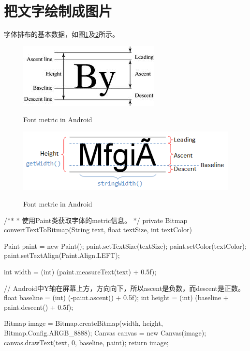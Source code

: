 ﻿\section[Draw text as picture]{把文字绘制成图片}
字体排布的基本数据，如图\ref{fig:android_font_metric}及\ref{fig:android_font_metric_2}所示。

\begin{figure}
  \centering
  \includegraphics[width=.3\textwidth]{picturedir/font_metric.png}\\
  \caption{Font metric in Android}\label{fig:android_font_metric}
\end{figure}

\begin{figure}
  \centering
  \includegraphics[width=.6\textwidth]{picturedir/font_metric_2.png}\\
  \caption{Font metric in Android}\label{fig:android_font_metric_2}
\end{figure}

\begin{javacode}
/**
 *  使用Paint类获取字体的metric信息。
 */
private Bitmap convertTextToBitmap(String text, float textSize, int textColor) {
  Paint paint = new Paint();
  paint.setTextSize(textSize);
  paint.setColor(textColor);
  paint.setTextAlign(Paint.Align.LEFT);
  
  int width = (int) (paint.measureText(text) + 0.5f);
  
  // Android中Y轴在屏幕上方，方向向下，所以ascent是负数，而descent是正数。
  float baseline = (int) (-paint.ascent() + 0.5f);
  int height = (int) (baseline + paint.descent() + 0.5f);
  
  Bitmap image = Bitmap.createBitmap(width, height, Bitmap.Config.ARGB_8888);
  Canvas canvas = new Canvas(image);
  canvas.drawText(text, 0, baseline, paint);
  return image;
}
\end{javacode}